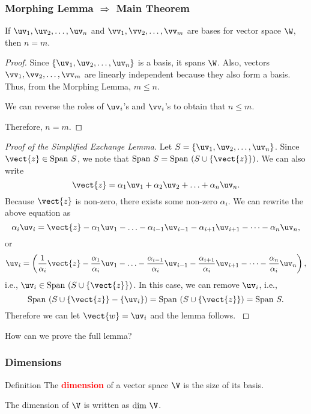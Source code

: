 \begin{frame}
  \frametitle{Morphing Lemma $\Rightarrow$ Main Theorem}
  \begin{theorem}
    If $\uv_1,\uv_2,\ldots,\uv_n$ and $\vv_1,\vv_2,\ldots,\vv_m$ are bases for vector space $\W$, then $n=m$.
  \end{theorem}

  \pause
  \begin{proof}
    Since $\{\uv_1,\uv_2,\ldots,\uv_n\}$ is a basis, it spans $\W$.
    Also, vectors $\vv_1,\vv_2,\ldots,\vv_m$ are linearly independent
    because they also form a basis.  Thus, from the Morphing Lemma, $m\leq n$.

    \pause
    We can reverse the roles of $\uv_i$'s and $\vv_i$'s to obtain that $n\leq m$.

    \pause
    Therefore, $n=m$.
  \end{proof}
\end{frame}

\begin{frame}
  \begin{proof}[Proof of the Simplified Exchange Lemma]
    {\footnotesize
      \pause
      Let $S=\{\uv_1,\uv_2,\ldots,\uv_n\}$. 
      Since $\vect{z}\in\mathrm{Span}~S$, \pause
      we note that $\mathrm{Span}~S=\mathrm{Span}~(S\cup\{\vect{z}\})$.
      \pause
      We can also write
      \[
      \vect{z}=\alpha_1\uv_1+\alpha_2\uv_2+\ldots+\alpha_n\uv_n.
      \]
      \pause
      Because $\vect{z}$ is non-zero, there exists some non-zero $\alpha_i$.
      \pause
      We can rewrite the above equation as
      \[
      \alpha_i\uv_i=\vect{z} -
      \alpha_1\uv_1-\ldots
      -\alpha_{i-1}\uv_{i-1}-\alpha_{i+1}\uv_{i+1}-\cdots
      -\alpha_n\uv_n,
      \]
      \pause
      or
      \[
      \uv_i = \left(
      \frac{1}{\alpha_i}\vect{z} -
      \frac{\alpha_1}{\alpha_i}\uv_1-\ldots
      -\frac{\alpha_{i-1}}{\alpha_i}\uv_{i-1}
      -\frac{\alpha_{i+1}}{\alpha_i}\uv_{i+1}-\cdots
      -\frac{\alpha_n}{\alpha_i}\uv_n
      \right),
      \]
      \pause
      i.e., $\uv_i\in\mathrm{Span}~(S\cup\{\vect{z}\})$.  \pause In this
      case, we can remove $\uv_i$, i.e.,
      \[
      \mathrm{Span}~(S\cup\{\vect{z}\}-\{\uv_i\})=
      \mathrm{Span}~(S\cup\{\vect{z}\})=
      \mathrm{Span}~S.
      \]
      \pause
      Therefore we
      can let $\vect{w}=\uv_i$ and the lemma follows.
    }
  \end{proof}
  \pause

  {\small
    How can we prove the full lemma?
  }
\end{frame}

\begin{frame}
  \frametitle{Dimensions}

  \begin{block}{Definition}
    The \textcolor{red}{\bf dimension} of a vector space $\V$ is the size of its basis.
    
    The dimension of $\V$ is written as $\mathrm{dim}~\V$.
  \end{block}
\end{frame}

